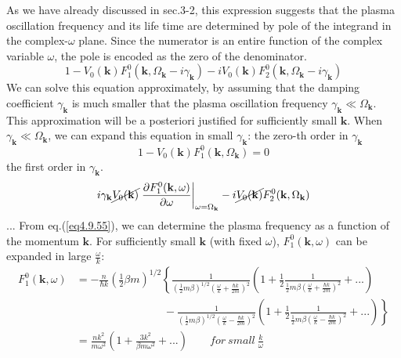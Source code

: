  As we have already discussed in sec.3-2, this expression suggests that the plasma oscillation frequency and its life time are determined by pole of the integrand in the complex-$\omega$ plane.
 Since the numerator is an entire function of the complex variable $\omega$, the pole is encoded as the zero of the denominator.
\begin{equation}
1-V_0(\mathbf k)F_1^0(\mathbf k,\Omega_{\mathbf k}-i\gamma_{\mathbf k}) -iV_0(\mathbf k)F_2^0(\mathbf k,\Omega_{\mathbf k}-i\gamma_{\mathbf k}) 
\end{equation}
 We can solve this equation approximately, by assuming that the damping coefficient $\gamma_{\mathbf k}$ is much smaller that the plasma oscillation frequency $\gamma_{\mathbf k}\ll \Omega_{\mathbf k}$.
 This approximation will be a posteriori justified for sufficiently small $\mathbf k$.
 When $\gamma_{\mathbf k}\ll \Omega_{\mathbf k}$, we can expand this equation in small $\gamma_{\mathbf k}$:
 the zero-th order in $\gamma_{\mathbf k}$
\begin{equation}\label{eq4.9.55}
1-V_0(\mathbf k)F_1^0(\mathbf k,\Omega_{\mathbf k})=0
\end{equation}
 the first order in $\gamma_{\mathbf k}$.
\begin{equation}
i\gamma_{\mathbf k}\cancel{V_0(\mathbf k)}\left.\frac{\partial F_1^0(\mathbf k,\omega)}{\partial \omega}\right|_{\omega=\Omega_{\mathbf k}}-i\cancel{V_0(\mathbf k)} F_2^0(\mathbf k,\Omega_{\mathbf k})
\end{equation}
 ...
 From eq.(\ref{eq4.9.55}), we can determine the plasma frequency as a function of the momentum $\mathbf k$.
 For sufficiently small $\mathbf k$ (with fixed $\omega$), $F_1^0(\mathbf k,\omega)$ can be expanded in large $\frac{\omega}{k}$:
\begin{equation}
\begin{aligned}
F_1^0(\mathbf k,\omega)&=-\frac{n}{\hbar k}\left( \frac{1}{2}\beta m \right)^{1/2} \left\{ \frac{1}{\left(\frac{1}{2}m\beta\right)^{1/2} \left( \frac{\omega}{k}+\frac{\hbar k}{2m} \right)^2}  \left(1+\frac{1}{2} \frac{1}{\frac{1}{2}m\beta \left( \frac{\omega}{k}+\frac{\hbar k}{2m} \right)^2} +...\right)  \right.\\
&\qquad\qquad\qquad\qquad-\left.\frac{1}{\left( \frac{1}{2}m\beta\right)^{1/2} \left( \frac{\omega}{k}-\frac{\hbar k}{2m} \right)^2} \left(1+\frac{1}{2} \frac{1}{\frac{1}{2}m\beta \left( \frac{\omega}{k}-\frac{\hbar k}{2m} \right)^2} +...\right)  \right\}\\
&=\frac{nk^2}{m\omega^2}\left( 1+\frac{3k^2}{\beta m\omega^2}+... \right)\qquad for\ small\ \frac{k}{\omega}
\end{aligned}
\end{equation}
